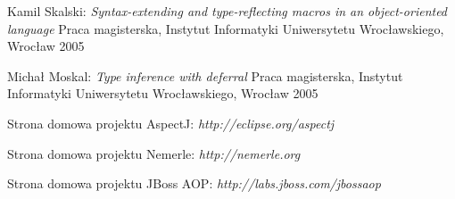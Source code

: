 \documentclass[a4paper,12pt]{mwbk}
\begin{document}
\begin{thebibliography}{99}
Kamil Skalski: {\it Syntax-extending and type-reflecting macros in an object-oriented language}
Praca magisterska, Instytut Informatyki Uniwersytetu Wrocławskiego, Wrocław 2005

Michał Moskal: {\it Type inference with deferral}
Praca magisterska, Instytut Informatyki Uniwersytetu Wrocławskiego, Wrocław 2005

Strona domowa projektu AspectJ: {\it http://eclipse.org/aspectj}

Strona domowa projektu Nemerle: {\it http://nemerle.org}

Strona domowa projektu JBoss AOP: {\it http://labs.jboss.com/jbossaop}

\end{thebibliography}
\end{document}
